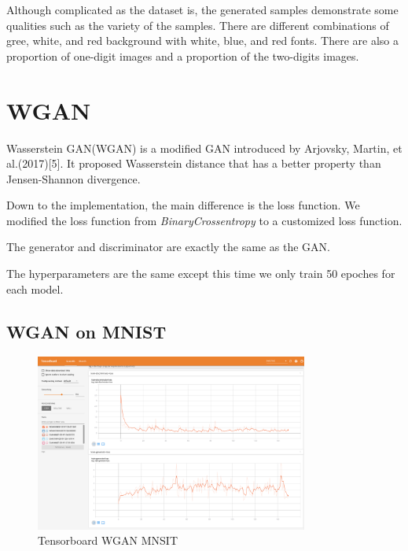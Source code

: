 \documentclass{article}
\begin{document}
Although complicated as the dataset is, the generated samples demonstrate some qualities such as the variety of the samples. There are different combinations of gree, white, and red background with white, blue, and red fonts.
There are also a proportion of one-digit images and a proportion of the two-digits images.

\section{WGAN}

Wasserstein GAN(WGAN) is a modified GAN introduced by Arjovsky, Martin, et al.(2017)[5]. 
It proposed Wasserstein distance that has a better property than Jensen-Shannon divergence.

Down to the implementation, the main difference is the loss function. We modified the loss function from \textit{BinaryCrossentropy} to a customized loss function.

The generator and discriminator are exactly the same as the GAN.

The hyperparameters are the same except this time we only train 50 epoches for each model.

\subsection{WGAN on MNIST}

\begin{figure}[!htb]
  \centering
  \includegraphics[width=0.8\textwidth]{imgs/tensorboard-WGAN-MNIST.png}
  \caption{Tensorboard WGAN MNSIT}
  \label{fig_TB_WGAN_MNSIT}
\end{figure}
\end{document}
